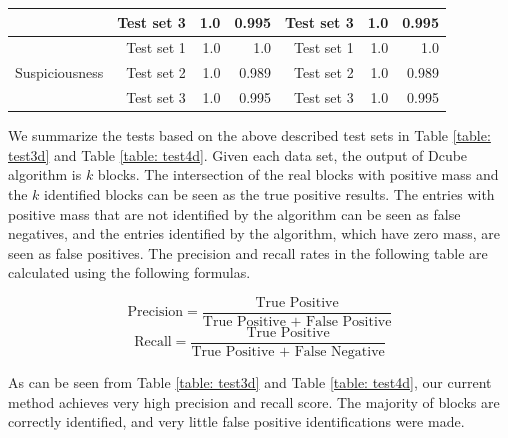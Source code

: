 \begin{table}[h]
\begin{tabular}{r|r|r|r|r|r|r}
                                                                                                                                 & Test set 3                   & 1.0                            & 0.995                       & Test set 3                   & 1.0                            & 0.995                       \\ \hline
\multirow{3}{*}{Suspiciousness}                                                                                                  & Test set 1                   & 1.0                            & 1.0                         & Test set 1                   & 1.0                            & 1.0                         \\ \cline{2-7} 
                                                                                                                                 & Test set 2                   & 1.0                            & 0.989                       & Test set 2                   & 1.0                            & 0.989                       \\ \cline{2-7} 
                                                                                                                                 & Test set 3                   & 1.0                            & 0.995                       & Test set 3                   & 1.0                            & 0.995                       \\ \hline
\end{tabular}
\end{table}
We summarize the tests based on the above described test sets in Table \ref{table: test3d} and Table \ref{table: test4d}. Given each data set, the output of Dcube algorithm is $k$ blocks. The intersection of the real blocks with positive mass and the $k$ identified blocks can be seen as the true positive results. The entries with positive mass that are not identified by the algorithm can be seen as false negatives, and the entries identified by the algorithm, which have zero mass, are seen as false positives. The precision and recall rates in the following table are calculated using the following formulas.

$$\text{Precision} = \frac{\text{True Positive}}{\text{True Positive + False Positive}}$$
$$\text{Recall} = \frac{\text{True Positive}}{\text{True Positive + False Negative}}$$

As can be seen from Table \ref{table: test3d} and Table \ref{table: test4d}, our current method achieves very high precision and recall score. The majority of blocks are correctly identified, and very little false positive identifications were made.

